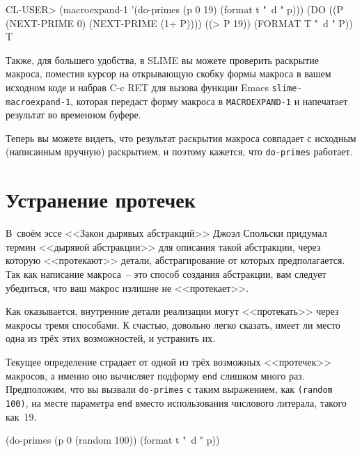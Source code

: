 \begin{myverb}
CL-USER> (macroexpand-1 '(do-primes (p 0 19) (format t "~d " p)))
(DO ((P (NEXT-PRIME 0) (NEXT-PRIME (1+ P))))
    ((> P 19))
  (FORMAT T "~d " P))
T
\end{myverb}

Также, для большего удобства, в SLIME вы можете проверить раскрытие макроса, поместив
курсор на открывающую скобку формы макроса в вашем исходном коде и набрав C-c RET для
вызова функции Emacs \lstinline{slime-macroexpand-1}, которая передаст форму макроса в
\lstinline{MACROEXPAND-1} и напечатает результат во временном буфере.

Теперь вы можете видеть, что результат раскрытия макроса совпадает с исходным (написанным
вручную) раскрытием, и поэтому кажется, что \lstinline{do-primes} работает.

\section{Устранение протечек}

В~своём эссе <<Закон дырявых абстракций>> Джоэл Спольски придумал термин <<дырявой
абстракции>> для описания такой абстракции, через которую <<протекают>> детали,
абстрагирование от которых предполагается. Так как написание макроса~-- это способ
создания абстракции, вам следует убедиться, что ваш макрос излишне не
<<протекает>>.

Как оказывается, внутренние детали реализации могут <<протекать>> через макросы тремя
способами. К счастью, довольно легко сказать, имеет ли место одна из трёх этих
возможностей, и устранить их.

Текущее определение страдает от одной из трёх возможных <<протечек>> макросов, а именно оно
вычисляет подформу \lstinline{end} слишком много раз. Предположим, что вы вызвали
\lstinline{do-primes} с таким выражением, как \lstinline{(random 100)}, на месте параметра
\lstinline{end} вместо использования числового литерала, такого как~19.

\begin{myverb}
(do-primes (p 0 (random 100))
  (format t "~d " p))
\end{myverb}

